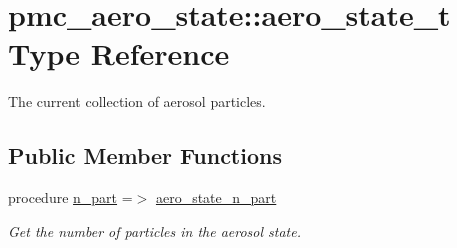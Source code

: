 \hypertarget{structpmc__aero__state_1_1aero__state__t}{}\section{pmc\+\_\+aero\+\_\+state\+:\+:aero\+\_\+state\+\_\+t Type Reference}
\label{structpmc__aero__state_1_1aero__state__t}


The current collection of aerosol particles.  


\subsection*{Public Member Functions}
\begin{DoxyCompactItemize}
\item 
procedure \mbox{\hyperlink{structpmc__aero__state_1_1aero__state__t_ae4c0b9d8e26a78cc678af107994742e0}{n\+\_\+part}} =$>$ \mbox{\hyperlink{namespacepmc__aero__state_a94155bf7fa94e7c3ab722a5a1dacac98}{aero\+\_\+state\+\_\+n\+\_\+part}}
\begin{DoxyCompactList}\small\item\em Get the number of particles in the aerosol state. \end{DoxyCompactList}\end{DoxyCompactItemize}
